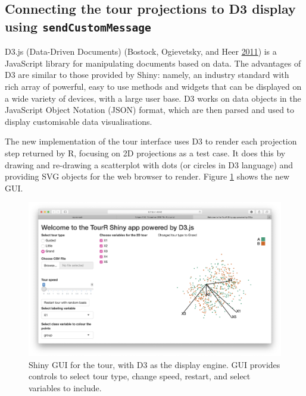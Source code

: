 \hypertarget{connecting-the-tour-projections-to-d3-display-using-sendcustommessage}{%
\subsection{\texorpdfstring{Connecting the tour projections to D3
display using
\texttt{sendCustomMessage}}{Connecting the tour projections to D3 display using sendCustomMessage}}\label{connecting-the-tour-projections-to-d3-display-using-sendcustommessage}}

D3.js (Data-Driven Documents) (Bostock, Ogievetsky, and Heer
\protect\hyperlink{ref-D3}{2011}) is a JavaScript library for
manipulating documents based on data. The advantages of D3 are similar
to those provided by Shiny: namely, an industry standard with rich array
of powerful, easy to use methods and widgets that can be displayed on a
wide variety of devices, with a large user base. D3 works on data
objects in the JavaScript Object Notation (JSON) format, which are then
parsed and used to display customisable data visualisations.

The new implementation of the tour interface uses D3 to render each
projection step returned by R, focusing on 2D projections as a test
case. It does this by drawing and re-drawing a scatterplot with dots (or
circles in D3 language) and providing SVG objects for the web browser to
render. Figure \ref{tourrD3} shows the new GUI.

\begin{figure}[ht]
\centerline{\includegraphics[width=15cm]{figures/TourrD3.png}}
\caption{Shiny GUI for the tour, with D3 as the display engine. GUI provides controls to select tour type, change speed, restart, and select variables to include.}
\label{tourrD3}
\end{figure}

